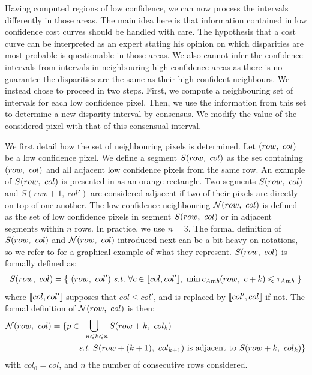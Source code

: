 Having computed regions of low confidence, we can now process the intervals differently in those areas. The main idea here is that information contained in low confidence cost curves should be handled with care. The hypothesis that a cost curve can be interpreted as an expert stating his opinion on which disparities are most probable is questionable in those areas. We also cannot infer the confidence intervals from intervals in neighbouring high confidence areas as there is no guarantee the disparities are the same as their high confident neighbours. We instead chose to proceed in two steps. First, we compute a neighbouring set of intervals for each low confidence pixel. Then, we use the information from this set to determine a new disparity interval by consensus. We modify the value of the considered pixel with that of this consensual interval.

We first detail how the set of neighbouring pixels is determined. Let $(row, ~col)$ be a low confidence pixel. We define a segment $S(row, ~col)$ as the set containing $(row, ~col)$ and all adjacent low confidence pixels from the same row. An example of $S(row, ~col)$ is presented in  as an orange rectangle. Two segments $S(row, ~col)$ and $S(row+1, ~col')$ are considered adjacent if two of their pixels are directly on top of one another. The low confidence neighbouring $\mathcal{N}(row,~col)$ is defined as the set of low confidence pixels in segment $S(row, ~col)$ or in adjacent segments within $n$ rows. In practice, we use $n=3$. The formal definition of $S(row, ~col)$ and $\mathcal{N}(row,~col)$ introduced next can be a bit heavy on notations, so we refer to  for a graphical example of what they represent. $S(row, ~col)$ is formally defined as:
\begin{align}
    S(\rowcol) = \{~ (row,~col') \text{ \st }~\forall c\in\opi col, col'\cli,~\min c_{Amb}(row, ~c+k)\leqslant \tau_{Amb}~\}
\end{align}
where $[\![ col, col']\!]$ supposes that $col\leqslant col'$, and is replaced by $[\![ col', col]\!]$ if not. The formal definition of $\mathcal{N}(row,~col)$ is then:
\begin{align}
    \N(row,~col) = \{ p\in &\bigcup_{-n\leqslant k\leqslant n}S(row+k, ~col_k)\nonumber\\
    &\st~S(row + (k+1), ~col_{k+1})\text{ is adjacent to }S(row+k, ~col_{k})\}
\end{align}
with $col_0=col$, and $n$ the number of consecutive rows considered.

